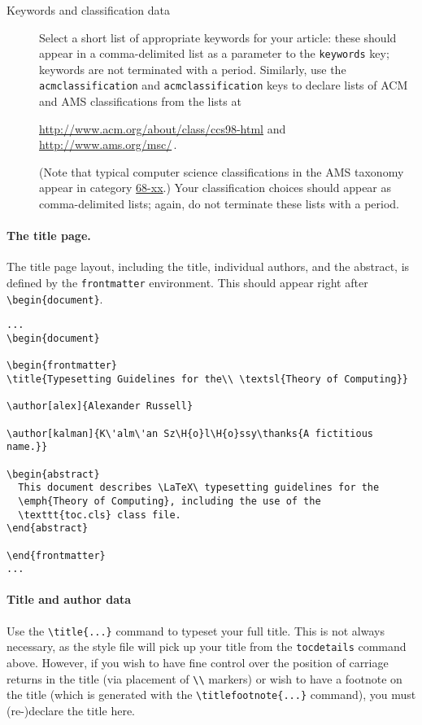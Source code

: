 \documentclass{article}
\theoremstyle{plain}
\theoremstyle{definition}
\begin{document}
\begin{description}
\item[Keywords and classification data] Select a short list of appropriate keywords for your article: these should appear in a comma-delimited list as a parameter to the \lstinline`keywords` key; keywords are not terminated with a period. Similarly, use the \lstinline`acmclassification` and \lstinline`acmclassification` keys to declare lists of ACM and AMS classifications from the lists at
  \begin{center}
    \url{http://www.acm.org/about/class/ccs98-html} \quad and \quad \url{http://www.ams.org/msc/}\,.
  \end{center}
(Note that typical computer science classifications in the AMS taxonomy appear in category \href{http://www.ams.org/msc/68-xx.html}{68-xx}.) Your classification choices should appear as comma-delimited lists; again, do not terminate these lists with a period.
\end{description}

\paragraph{The title page.} 
The title page layout, including the title, individual authors, and the abstract, is defined by the \lstinline`frontmatter` environment. This should appear 
right after \lstinline`\begin{document}`. 

\begin{lstlisting}
...
\begin{document}

\begin{frontmatter}
\title{Typesetting Guidelines for the\\ \textsl{Theory of Computing}}

\author[alex]{Alexander Russell}

\author[kalman]{K\'alm\'an Sz\H{o}l\H{o}ssy\thanks{A fictitious
name.}}

\begin{abstract}
  This document describes \LaTeX\ typesetting guidelines for the
  \emph{Theory of Computing}, including the use of the
  \texttt{toc.cls} class file.
\end{abstract}

\end{frontmatter}
...
\end{lstlisting}

\paragraph{Title and author data}
Use the \lstinline`\title{...}` command to typeset your full title. This is not always necessary, as the style file will pick up your title from the \lstinline`tocdetails` command above. However, if you wish to have fine control over the position of carriage returns in the title (via placement of \lstinline`\\` markers) or wish to have a footnote on the title (which is generated with the \lstinline`\titlefootnote{...}` command), you must (re-)declare the title here.
\end{document}
